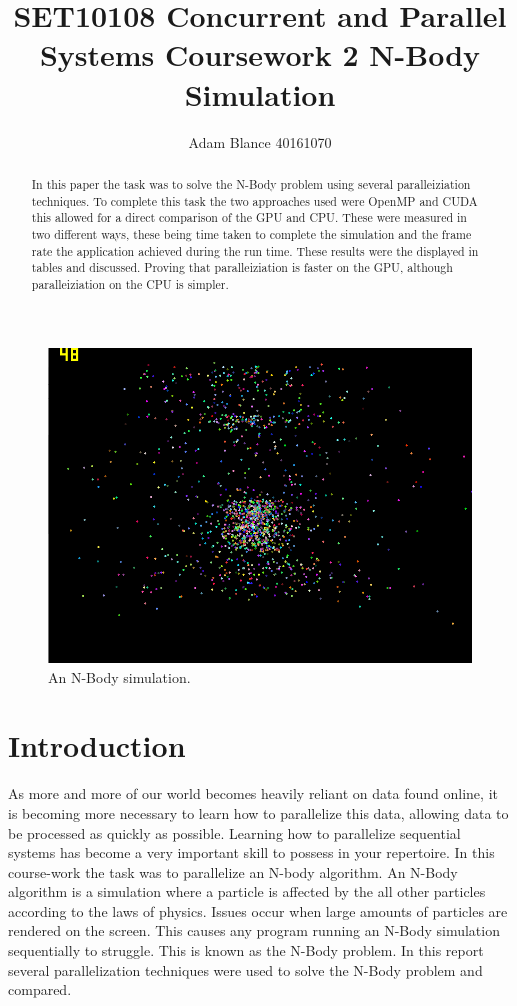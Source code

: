 \documentclass[12pt]{article}
\author{Adam Blance 40161070}
\begin{document}
	\title{SET10108 Concurrent and Parallel Systems \linebreak Coursework 2 \linebreak N-Body Simulation}
	\maketitle
\begin{abstract}
In this paper the task was to solve the N-Body problem using several paralleiziation techniques. To complete this task the two approaches used were OpenMP and CUDA this allowed for a direct comparison of the GPU and CPU. These were measured in two different ways, these being time taken to complete the simulation and the frame rate the application achieved during the run time. These results were the displayed in tables and discussed. Proving that paralleiziation is faster on the GPU, although paralleiziation on the CPU is simpler.
		
\end{abstract}
\begin{figure}
	\includegraphics[scale=0.5]{pics/intro.png}
	\caption{An N-Body simulation.}
\end{figure}
\newpage 		
\section{Introduction}
As more and more of our world becomes heavily reliant on data found online, it is  becoming more necessary to learn how to parallelize this data, allowing data to be processed as quickly as possible.  Learning how to parallelize sequential systems has become a very important skill to possess in your repertoire. 
\newline 
In this course-work the task was to parallelize an N-body algorithm. An N-Body algorithm is a simulation where a particle is affected by the all other particles according to the laws of physics. Issues occur when large amounts of particles are rendered on the screen. This causes any program running an N-Body simulation sequentially to struggle. This is known as the N-Body problem. In this report several
parallelization techniques were used to solve the N-Body problem and compared.
\end{document}
